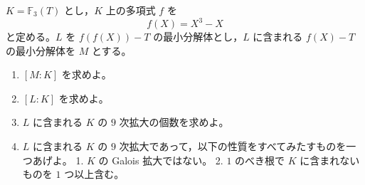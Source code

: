 \documentclass[12pt]{jlreq}
\newcommand{\F}{\mathbb{F}}
\begin{document}
\(K=\F_3(T)\) とし，\(K\) 上の多項式 \(f\) を
\[
  f(X)=X^3-X
\]
と定める。\(L\) を \(f(f(X))-T\) の最小分解体とし，\(L\) に含まれる \(f(X)-T\) の最小分解体を \(M\) とする。

\begin{enumerate}
  \item \([M:K]\) を求めよ。
  \item \([L:K]\) を求めよ。
  \item \(L\) に含まれる \(K\) の \(9\) 次拡大の個数を求めよ。
  \item \(L\) に含まれる \(K\) の \(9\) 次拡大であって，以下の性質をすべてみたすものを一つあげよ。
   1. \(K\) の Galois 拡大ではない。
   2.  \(1\) のべき根で \(K\) に含まれないものを \(1\) つ以上含む。

\end{enumerate}
\end{document}
